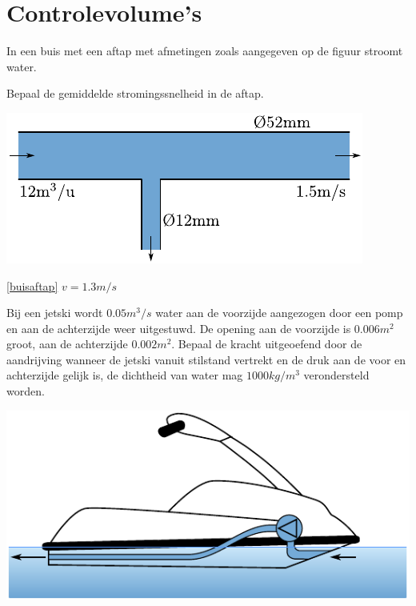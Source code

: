 \chapter{Controlevolume's}
\label{sec:Controlevolume's}
\begin{toepassing}
	\label{buisaftap}
In een buis met een aftap met afmetingen zoals aangegeven op de figuur stroomt water.
		
Bepaal de gemiddelde stromingssnelheid in de aftap.

	\centering
	\includegraphics{fig/behoudsvergelijkingen/buisaftap}
\end{toepassing}
\begin{antwoord}{\ref{buisaftap}}
	$v = 1.3\unit{m/s}$
\end{antwoord}
\begin{toepassing}
	\label{jetski}
Bij een jetski wordt $0.05\unit{m^3/s}$ water aan de voorzijde aangezogen door een pomp en aan de achterzijde weer uitgestuwd. De opening aan de voorzijde is $0.006\unit{m^2}$ groot, aan de achterzijde $0.002\unit{m^2}$. Bepaal de kracht uitgeoefend door de aandrijving wanneer de jetski vanuit stilstand vertrekt en de druk aan de voor en achterzijde gelijk is, de dichtheid van water mag $1000\unit{kg/m^3}$ verondersteld worden.

	\centering
	\includegraphics{fig/behoudsvergelijkingen/jetski}
\end{toepassing}
